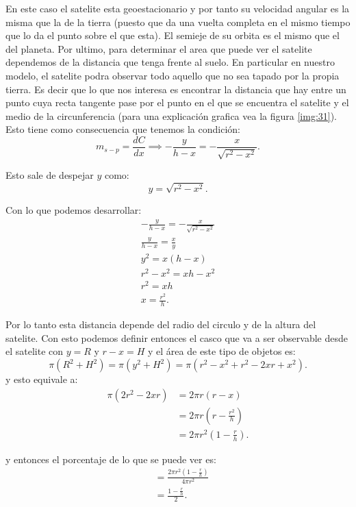 \documentclass{report}
\begin{document}
En este caso el satelite esta geoestacionario y por tanto su velocidad angular es la misma que la de la tierra (puesto que da una vuelta completa en el mismo tiempo que lo da el punto sobre el que esta). El semieje de su orbita es el mismo que el del planeta. Por ultimo, para determinar el area que puede ver el satelite dependemos de la distancia que tenga frente al suelo. En particular en nuestro modelo, el satelite podra observar todo aquello que no sea tapado por la propia tierra. Es decir que lo que nos interesa es encontrar la distancia que hay entre un punto cuya recta tangente pase por el punto en el que se encuentra el satelite y el medio de la circunferencia (para una explicación grafica vea la figura \ref{img:31}). Esto tiene como consecuencia que tenemos la condición: \[
m_{s-p} = \frac{d C}{dx} \implies -\frac{y}{h-x}=-\frac{x}{\sqrt{r^2-x^2} }
.\] 

Esto sale de despejar $y$ como:  \[
y = \sqrt{r^2 - x^2} 
.\] 

Con lo que podemos desarrollar: 
\begin{align*}
-\frac{y}{h-x}=-\frac{x}{\sqrt{r^2-x^2} }\\
\frac{y}{h-x}=\frac{x}{y}\\
y^2 = x\left( h-x \right) \\
r^2 - x^2 = xh - x^2\\
r^2 = xh \\
x = \frac{r^2}{h}
.\end{align*}

Por lo tanto esta distancia depende del radio del circulo y de la altura del satelite. Con esto podemos definir entonces el casco que va a ser observable desde el satelite con $y=R$ y $r-x = H$ y el área de este tipo de objetos es: \[
  \pi \left( R^2 + H^2 \right) = \pi\left( y^2 + H^2 \right) = \pi\left( r^2 - x^2 + r^2 - 2xr + x^2 \right) 
.\] y esto equivale a:
\begin{align*}
  \pi\left( 2r^2 - 2xr \right) &= 2\pi r \left( r - x \right)  \\
  &= 2\pi r \left( r - \frac{r^2}{h} \right)  \\
  &= 2\pi r^2 \left( 1 - \frac{r}{h} \right)
.\end{align*}

y entonces el porcentaje de lo que se puede ver es:
\begin{align*}
  &= \frac{2\pi r^2\left( 1 - \frac{r}{h} \right) }{4\pi r^2} \\
  &= \frac{1-\frac{r}{h}}{2}
.\end{align*}
\end{document}
